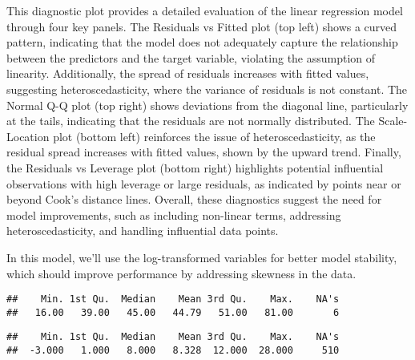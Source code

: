 \documentclass[
]{article}
\newenvironment{Shaded}{\begin{snugshade}}{\end{snugshade}}
\newcommand{\FunctionTok}[1]{\textcolor[rgb]{0.13,0.29,0.53}{\textbf{#1}}}
\newcommand{\NormalTok}[1]{#1}
\newcommand{\SpecialCharTok}[1]{\textcolor[rgb]{0.81,0.36,0.00}{\textbf{#1}}}
\begin{document}
This diagnostic plot provides a detailed evaluation of the linear
regression model through four key panels. The Residuals vs Fitted plot
(top left) shows a curved pattern, indicating that the model does not
adequately capture the relationship between the predictors and the
target variable, violating the assumption of linearity. Additionally,
the spread of residuals increases with fitted values, suggesting
heteroscedasticity, where the variance of residuals is not constant. The
Normal Q-Q plot (top right) shows deviations from the diagonal line,
particularly at the tails, indicating that the residuals are not
normally distributed. The Scale-Location plot (bottom left) reinforces
the issue of heteroscedasticity, as the residual spread increases with
fitted values, shown by the upward trend. Finally, the Residuals vs
Leverage plot (bottom right) highlights potential influential
observations with high leverage or large residuals, as indicated by
points near or beyond Cook's distance lines. Overall, these diagnostics
suggest the need for model improvements, such as including non-linear
terms, addressing heteroscedasticity, and handling influential data
points.

In this model, we'll use the log-transformed variables for better model
stability, which should improve performance by addressing skewness in
the data.

\begin{Shaded}
\end{Shaded}

\begin{verbatim}
##    Min. 1st Qu.  Median    Mean 3rd Qu.    Max.    NA's 
##   16.00   39.00   45.00   44.79   51.00   81.00       6
\end{verbatim}

\begin{Shaded}
\end{Shaded}

\begin{verbatim}
##    Min. 1st Qu.  Median    Mean 3rd Qu.    Max.    NA's 
##  -3.000   1.000   8.000   8.328  12.000  28.000     510
\end{verbatim}
\end{document}
